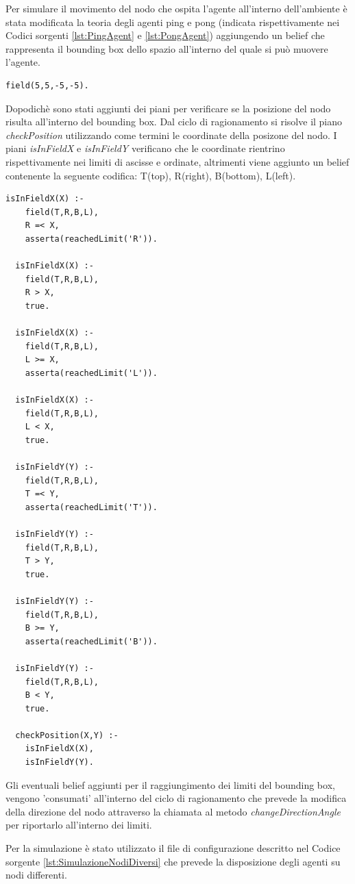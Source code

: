 \documentclass[12pt,a4paper,openright,twoside]{report}
\begin{document}
Per simulare il movimento del nodo che ospita l'agente all'interno dell'ambiente \`e stata modificata la teoria degli agenti ping e pong (indicata rispettivamente nei Codici sorgenti \ref{lst:PingAgent} e \ref{lst:PongAgent}) aggiungendo un belief che rappresenta il bounding box dello spazio all'interno del quale si pu\`o muovere l'agente.
\medskip
\begin{lstlisting}[firstnumber=1,caption={Bounding-box}]
  field(5,5,-5,-5).
\end{lstlisting}
Dopodich\`e sono stati aggiunti dei piani per verificare se la posizione del nodo risulta all'interno del bounding box. Dal ciclo di ragionamento si risolve il piano \textit{checkPosition} utilizzando come termini le coordinate della posizone del nodo.
I piani \textit{isInFieldX} e \textit{isInFieldY} verificano che le coordinate rientrino rispettivamente nei limiti di ascisse e ordinate, altrimenti viene aggiunto un belief contenente la seguente codifica: T(top), R(right), B(bottom), L(left).
\medskip
\begin{lstlisting}[firstnumber=18,caption={Piani per la gestione del bounding-box}]
  isInFieldX(X) :-
    field(T,R,B,L),
    R =< X,
    asserta(reachedLimit('R')).

  isInFieldX(X) :-
    field(T,R,B,L),
    R > X,
    true.

  isInFieldX(X) :-
    field(T,R,B,L),
    L >= X,
    asserta(reachedLimit('L')).

  isInFieldX(X) :-
    field(T,R,B,L),
    L < X,
    true.

  isInFieldY(Y) :-
    field(T,R,B,L),
    T =< Y,
    asserta(reachedLimit('T')).

  isInFieldY(Y) :-
    field(T,R,B,L),
    T > Y,
    true.

  isInFieldY(Y) :-
    field(T,R,B,L),
    B >= Y,
    asserta(reachedLimit('B')).

  isInFieldY(Y) :-
    field(T,R,B,L),
    B < Y,
    true.

  checkPosition(X,Y) :-
    isInFieldX(X),
    isInFieldY(Y).
\end{lstlisting}
Gli eventuali belief aggiunti per il raggiungimento dei limiti del bounding box, vengono 'consumati' all'interno del ciclo di ragionamento che prevede la modifica della direzione del nodo attraverso la chiamata al metodo \textit{changeDirectionAngle} per riportarlo all'interno dei limiti.

\bigskip

Per la simulazione \`e stato utilizzato il file di configurazione descritto nel Codice sorgente \ref{lst:SimulazioneNodiDiversi} che prevede la disposizione degli agenti su nodi differenti.
\end{document}
